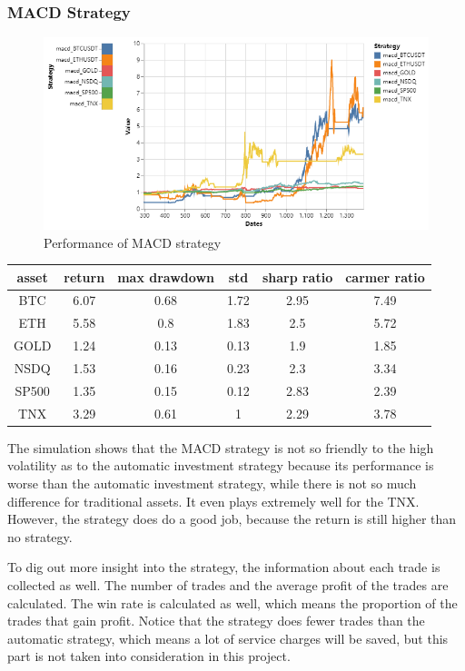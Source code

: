 \documentclass[a4paper]{article}
\begin{document}
\subsubsection{MACD Strategy}
\begin{figure}[H]
    \centering
    \includegraphics[scale=0.5]{Q3.png}
    \caption{Performance of MACD strategy}
\end{figure}
\begin{table}[H]
    \centering
    \begin{tabular}{@{}|c|c|c|c|c|c|@{}}
    \hline
    asset   & return & max drawdown & std & sharp ratio & carmer ratio \\ \hline
    BTC     & 6.07   & 0.68 & 1.72 & 2.95  & 7.49 \\ \hline
    ETH     & 5.58   & 0.8 & 1.83 & 2.5   & 5.72\\ \hline
    GOLD    & 1.24   & 0.13 & 0.13 & 1.9   & 1.85\\ \hline
    NSDQ    & 1.53   & 0.16 & 0.23 & 2.3   & 3.34\\ \hline
    SP500   & 1.35   & 0.15 & 0.12 & 2.83  & 2.39\\ \hline
    TNX     & 3.29   & 0.61 & 1    & 2.29  & 3.78\\ \hline
    \end{tabular}
\end{table}
The simulation shows that the MACD strategy is not so friendly to the high volatility as to the automatic investment strategy because its performance is worse than the automatic investment strategy, while there is not so much difference for traditional assets. It even plays extremely well for the TNX. However, the strategy does do a good job, because the return is still higher than no strategy. 
\par To dig out more insight into the strategy, the information about each trade is collected as well. The number of trades and the average profit of the trades are calculated. The win rate is calculated as well, which means the proportion of the trades that gain profit. Notice that the strategy does fewer trades than the automatic strategy, which means a lot of service charges will be saved, but this part is not taken into consideration in this project.
\end{document}
